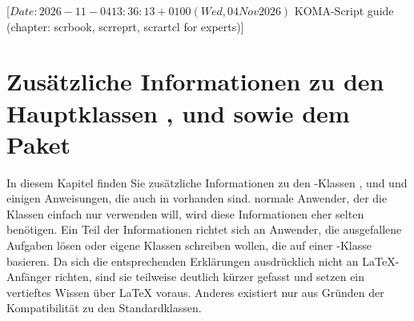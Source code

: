 %
%
%
%
%
%
%

%
                 [$Date: 2026-11-04 13:36:13 +0100 (Wed, 04 Nov 2026) $
                  KOMA-Script guide (chapter: scrbook, scrreprt, scrartcl for
                  experts)]

\chapter[{Zusätzliche Informationen zu den Hauptklassen und
  \Package{scrextend}}]{Zusätzliche
  Informationen zu den Hauptklassen
  ,  und
   sowie dem
  Paket }

\BeginIndexGroup%
%
%
%
%
In diesem Kapitel finden Sie zusätzliche Informationen zu den
\KOMAScript-Klassen ,  und  und
einigen Anweisungen, die auch in  vorhanden sind.
 normale Anwender, der die Klassen einfach nur verwenden will, wird
diese Informationen eher selten benötigen. Ein Teil der Informationen richtet
sich an Anwender, die ausgefallene Aufgaben lösen oder eigene Klassen
schreiben wollen, die auf einer \KOMAScript-Klasse basieren. Da sich die
entsprechenden Erklärungen ausdrücklich nicht an \LaTeX-Anfänger richten, sind
sie teilweise deutlich kürzer gefasst und setzen ein vertieftes Wissen über
\LaTeX{} voraus. Anderes existiert nur aus Gründen der Kompatibilität zu den
Standardklassen.

